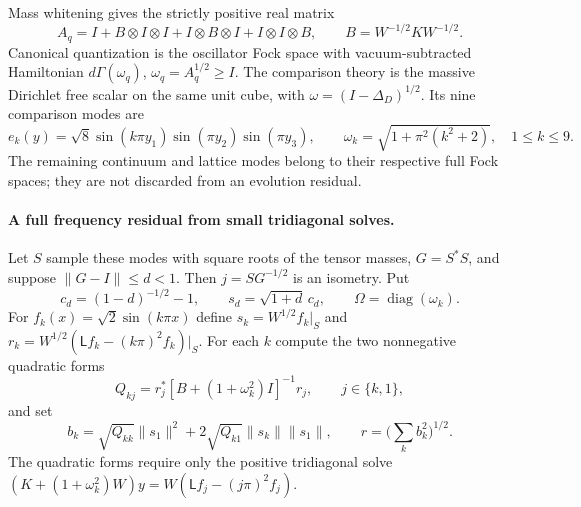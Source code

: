 Mass whitening gives the strictly positive real matrix
\[
 A_q=I+B\otimes I\otimes I+I\otimes B\otimes I+
 I\otimes I\otimes B,\qquad B=W^{-1/2}KW^{-1/2}.
\]
Canonical quantization is the oscillator Fock space with vacuum-subtracted
Hamiltonian $d\Gamma(\omega_q)$, $\omega_q=A_q^{1/2}\ge I$.
The comparison theory is the massive Dirichlet free scalar on the same
unit cube, with $\omega=(I-\Delta_D)^{1/2}$. Its nine comparison modes are
\[
 e_k(y)=\sqrt8\sin(k\pi y_1)\sin(\pi y_2)\sin(\pi y_3),
 \qquad \omega_k=\sqrt{1+\pi^2(k^2+2)},\quad 1\le k\le9.
\]
The remaining continuum and lattice modes belong to their respective full
Fock spaces; they are not discarded from an evolution residual.

\paragraph{A full frequency residual from small tridiagonal solves.}
Let $S$ sample these modes with square roots of the tensor masses,
$G=S^*S$, and suppose $\|G-I\|\le d<1$. Then
$j=SG^{-1/2}$ is an isometry. Put
\[
 c_d=(1-d)^{-1/2}-1,
 \qquad s_d=\sqrt{1+d}\,c_d,
 \qquad \Omega=\operatorname{diag}(\omega_k).
\]
For $f_k(x)=\sqrt2\sin(k\pi x)$ define
$s_k=W^{1/2}f_k|_S$ and
$r_k=W^{1/2}(\mathsf Lf_k-(k\pi)^2f_k)|_S$.
For each $k$ compute the two nonnegative quadratic forms
\[
 Q_{kj}=r_j^*[B+(1+\omega_k^2)I]^{-1}r_j,
 \qquad j\in\{k,1\},
\]
and set
\[
 b_k=\sqrt{Q_{kk}}\|s_1\|^2+
 2\sqrt{Q_{k1}}\|s_k\|\|s_1\|,\qquad
 r=\Big(\sum_k b_k^2\Big)^{1/2}.
\]
The quadratic forms require only the positive tridiagonal solve
$(K+(1+\omega_k^2)W)y=W(\mathsf Lf_j-(j\pi)^2f_j)$.

